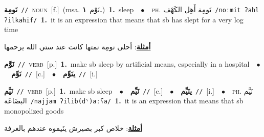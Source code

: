 \documentclass[10pt,a4paper,twoside]{article} %
\begin{document}
\begin{multicols}{2}
{\setlength\topsep{0pt}\textbf{\foreignlanguage{arabic}{نَومِة}}\ {\color{gray}\texttt{//}\color{black}}\ \textsc{noun}\ [f.]\ \color{gray}(msa. \foreignlanguage{arabic}{نَوْم}~\foreignlanguage{arabic}{\textbf{١.}})\color{black}\ \textbf{1.}~sleep\ \ $\bullet$\ \ \textsc{ph.} \color{gray} \foreignlanguage{arabic}{نَومِة أَهِل الكَهْف}\color{black}\ {\color{gray}\texttt{/{\sffamily noːmit ʔahl ʔilkahif}/}\color{black}}\ \textbf{1.}~it is an expression that means that sb has slept for a very log time\  \begin{flushright}\color{gray}\foreignlanguage{arabic}{\textbf{\underline{\foreignlanguage{arabic}{أمثلة}}}: أحلى نومِة نمتها كانت عند ستي الله يرحمها}\end{flushright}\color{black}} \vspace{2mm}

{\setlength\topsep{0pt}\textbf{\foreignlanguage{arabic}{نَوَّم}}\ {\color{gray}\texttt{//}\color{black}}\ \textsc{verb}\ [p.]\ \textbf{1.}~make sb sleep by artificial means, especially in a hospital\ \ $\bullet$\ \ \setlength\topsep{0pt}\textbf{\foreignlanguage{arabic}{نَوِّم}}\ {\color{gray}\texttt{//}\color{black}}\ [c.]\ \ $\bullet$\ \ \setlength\topsep{0pt}\textbf{\foreignlanguage{arabic}{ينَوِّم}}\ {\color{gray}\texttt{//}\color{black}}\ [i.]\ } \vspace{2mm}

{\setlength\topsep{0pt}\textbf{\foreignlanguage{arabic}{نَيَّم}}\ {\color{gray}\texttt{//}\color{black}}\ \textsc{verb}\ [p.]\ \textbf{1.}~make sb sleep\ \ $\bullet$\ \ \setlength\topsep{0pt}\textbf{\foreignlanguage{arabic}{نَيِّم}}\ {\color{gray}\texttt{//}\color{black}}\ [c.]\ \ $\bullet$\ \ \setlength\topsep{0pt}\textbf{\foreignlanguage{arabic}{ينَيِّم}}\ {\color{gray}\texttt{//}\color{black}}\ [i.]\ \ $\bullet$\ \ \textsc{ph.} \color{gray} \foreignlanguage{arabic}{نَيَّم البضَاعَة}\color{black}\ {\color{gray}\texttt{/{\sffamily najjam ʔilib(dˤ)aːʕa}/}\color{black}}\ \textbf{1.}~it is an expression that means that sb monopolized goods\  \begin{flushright}\color{gray}\foreignlanguage{arabic}{\textbf{\underline{\foreignlanguage{arabic}{أمثلة}}}: خلاص كبر بصيرش ينَيموه عندهم بالغرفة}\end{flushright}\color{black}} \vspace{2mm}


\end{multicols}
\end{document}
